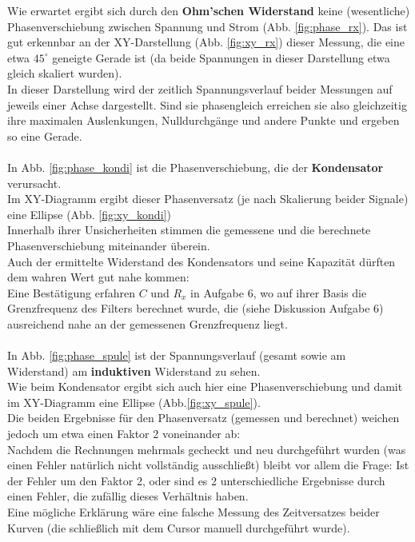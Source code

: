 \documentclass[12pt,a4paper]{article}
\begin{document}
\begin{multicols}{2}
Wie erwartet ergibt sich durch den \textbf{Ohm'schen Widerstand} keine (wesentliche) Phasenverschiebung zwischen Spannung und Strom (Abb. \ref{fig:phase_rx}). Das ist gut erkennbar an der XY-Darstellung (Abb. \ref{fig:xy_rx}) dieser Messung, die eine etwa $45^\circ$ geneigte Gerade ist (da beide Spannungen in dieser Darstellung etwa gleich skaliert wurden).\\
In dieser Darstellung wird der zeitlich Spannungsverlauf beider Messungen auf jeweils einer Achse dargestellt. Sind sie phasengleich erreichen sie also gleichzeitig ihre maximalen Auslenkungen, Nulldurchgänge und andere Punkte und ergeben so eine Gerade.\\
\\
In Abb. \ref{fig:phase_kondi} ist die Phasenverschiebung, die der \textbf{Kondensator} verursacht.\\
Im XY-Diagramm ergibt dieser Phasenversatz (je nach Skalierung beider Signale) eine Ellipse (Abb. \ref{fig:xy_kondi})\\
Innerhalb ihrer Unsicherheiten stimmen die gemessene und die berechnete Phasenverschiebung miteinander überein.\\
Auch der ermittelte Widerstand des Kondensators und seine Kapazität dürften dem wahren Wert gut nahe kommen:\\
Eine Bestätigung erfahren $C$ und $R_x$ in Aufgabe 6, wo auf ihrer Basis die Grenzfrequenz des Filters berechnet wurde, die (siehe Diskussion Aufgabe 6) ausreichend nahe an der gemessenen Grenzfrequenz liegt.\\
\\
In Abb. \ref{fig:phase_spule} ist der Spannungsverlauf (gesamt sowie am Widerstand) am \textbf{induktiven} Widerstand zu sehen.\\
Wie beim Kondensator ergibt sich auch hier eine Phasenverschiebung und damit im XY-Diagramm eine Ellipse (Abb.\ref{fig:xy_spule}).\\
Die beiden Ergebnisse für den Phasenversatz (gemessen und berechnet) weichen jedoch um etwa einen Faktor 2 voneinander ab:\\
Nachdem die Rechnungen mehrmals gecheckt und neu durchgeführt wurden (was einen Fehler natürlich nicht vollständig ausschließt) bleibt vor allem die Frage: Ist der Fehler um den Faktor 2, oder sind es 2 unterschiedliche Ergebnisse durch einen Fehler, die zufällig dieses Verhältnis haben.\\
Eine mögliche Erklärung wäre eine falsche Messung des Zeitversatzes beider Kurven (die schließlich mit dem Cursor manuell durchgeführt wurde).


\end{multicols}
\end{document}
